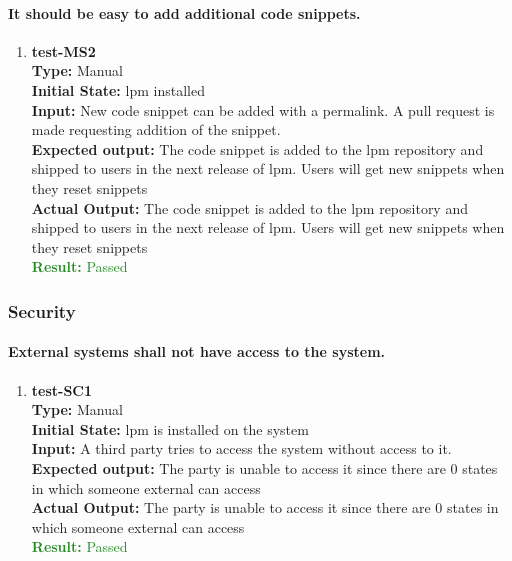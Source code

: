 \documentclass[12pt, titlepage]{article}
\begin{document}
\paragraph{ It should be easy to add additional code snippets.}
\begin{enumerate}
    \item{\textbf{test-MS2}\\}
    \textbf{Type:} Manual\\
    \textbf{Initial State:} lpm installed\\
    \textbf{Input:} New code snippet can be added with a permalink. A pull request is made requesting addition of the snippet.\\
    \textbf{Expected output: } The code snippet is added to the lpm repository and shipped to users in the next release of lpm. Users will get new snippets when they reset snippets\\
    \textbf{Actual Output:}  The code snippet is added to the lpm repository and shipped to users in the next release of lpm. Users will get new snippets when they reset snippets\\
    \textcolor{ForestGreen}{\textbf{Result:} Passed}
\end{enumerate}

\subsubsection{Security}
\paragraph{External systems shall not have access to the system.}
\begin{enumerate}
    \item{\textbf{test-SC1}\\}
    \textbf{Type:} Manual\\
    \textbf{Initial State:} lpm is installed on the system \\
    \textbf{Input:} A third party tries to access the system without access to it.\\
    \textbf{Expected output: } The party is unable to access it since there are 0 states in which someone external can access \\
    \textbf{Actual Output:}  The party is unable to access it since there are 0 states in which someone external can access \\
    \textcolor{ForestGreen}{\textbf{Result: } Passed}
\end{enumerate}
\end{document}
